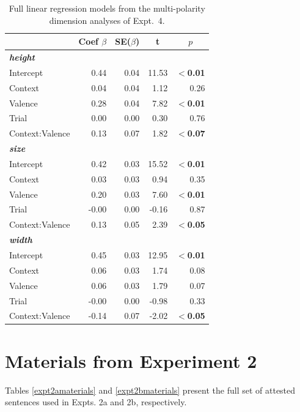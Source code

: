 \documentclass[preprint,12pt,authoryear,titlepage]{elsarticle}
\begin{document}
\begin{table}[htb] 
	\renewcommand\thetable{D.1}
	\centering \caption{Full linear regression models from the multi-polarity dimension analyses of Expt.~4.} \label{expt4analysisb}
	\begin{tabular}{lrrrr}\toprule
		&	Coef $\beta$	&	SE($\beta$)	&	\multicolumn{1}{c}{ \textbf{t}}	&	\multicolumn{1}{c}{$p$}\\ \midrule
		\emph{\textbf{height}}\\
		Intercept 		& 	0.44 	&	0.04	&	11.53	&	\textbf{$<$0.01} \\
		Context			&	0.04	&   0.04	&	1.12	&	0.26 \\
		Valence			&	0.28	&   0.04	&	7.82	&	\textbf{$<$0.01} \\
		Trial			&	0.00	&   0.00	&	0.30	&	0.76 \\
		Context:Valence	&	0.13	&   0.07	&	1.82	&	\textbf{$<$0.07} \\ \hline
		\emph{\textbf{size}}\\
		Intercept 		& 	0.42 	&	0.03	&	15.52	&	\textbf{$<$0.01} \\
		Context			&	0.03	&   0.03	&	0.94	&	0.35 \\
		Valence			&	0.20	&   0.03	&	7.60	&	\textbf{$<$0.01} \\
		Trial			&	-0.00	&   0.00	&	-0.16	&	0.87 \\
		Context:Valence	&	0.13	&   0.05	&	2.39	&	\textbf{$<$0.05} \\ \hline
		\emph{\textbf{width}}\\
		Intercept 		& 	0.45 	&	0.03	&	12.95	&	\textbf{$<$0.01} \\
		Context			&	0.06	&   0.03	&	1.74	&	0.08 \\
		Valence			&	0.06	&   0.03	&	1.79	&	0.07 \\
		Trial			&	-0.00	&   0.00	&	-0.98	&	0.33 \\
		Context:Valence	&	-0.14	&   0.07	&	-2.02	&	\textbf{$<$0.05} \\ \bottomrule
	\end{tabular}
\end{table}

\section{Materials from Experiment 2}\label{expt2sentences}

Tables \ref{expt2amaterials} and \ref{expt2bmaterials} present the full set of attested sentences used in Expts. 2a and 2b, respectively.
\end{document}
